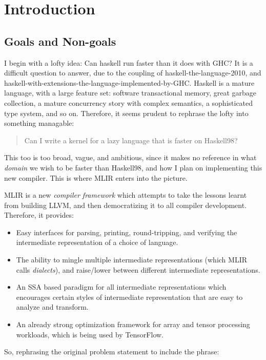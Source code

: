 \documentclass{book}
\begin{document}
\chapter{Introduction}

\section{Goals and Non-goals}

I begin with a lofty idea: Can haskell run faster than it does with GHC? It is
a difficult question to answer, due to the coupling of
haskell-the-language-2010, and
haskell-with-extensions-the-language-implemented-by-GHC. Haskell is a mature
language, with a large feature set: software transactional memory, great
garbage collection, a mature concurrency story with complex semantics, a
sophisticated type system, and so on. Therefore, it seems prudent to rephrase
the lofty into something managable:

\begin{quote}
Can I write a kernel for a lazy language that is faster on Haskell98?
\end{quote}

This too is too broad, vague, and ambitious, since it makes no reference in what
\emph{domain} we wish to be faster than Haskell98, and how I plan on implementing
this new compiler. This is where MLIR enters into the picture. 

MLIR is a new \emph{compiler framework} which attempts to take the lessons
learnt from building LLVM, and then democratizing it to all compiler
development. Therefore, it provides:
\begin{itemize}
\item Easy interfaces for parsing, printing, round-tripping,
and verifying the intermediate representation of a choice of language.
\item The ability to mingle multiple intermediate representations (which MLIR calls \emph{dialects}),
       and raise/lower between different intermediate representations.
\item An SSA based paradigm for all intermediate representations which
      encourages certain styles of intermediate representation that are easy to
      analyze and transform.
\item An already strong optimization framework for array and tensor processing
      workloads, which is being used by TensorFlow.
\end{itemize}

So, rephrasing the original problem statement to include the phrase:
\end{document}
